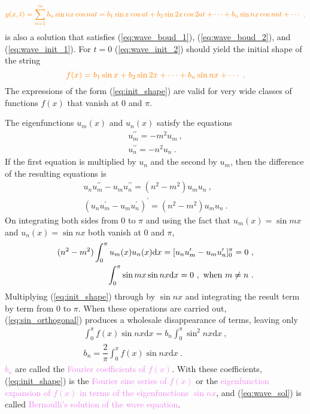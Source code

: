 \documentclass[12pt,a4paper]{article}
\newcommand{\dif}{\mathrm{d}}
\begin{document}
\begin{equation}
\color{orange} y(x,t) = \sum_{n=1}^\infty b_n \sin nx \cos nat = b_1 \sin x \cos at +b_2 \sin 2x \cos 2at +\cdots +b_n \sin nx \cos nat + \cdots ~,
\label{eq:wave_sol}
\end{equation}
is also a solution that satisfies (\ref{eq:wave_boud_1}), (\ref{eq:wave_boud_2}), and (\ref{eq:wave_init_1}). For $t =0$ (\ref{eq:wave_init_2}) should yield the initial shape of the string
\begin{equation}
\color{orange} f(x) = b_1 \sin x+b_2 \sin 2x  +\cdots +b_n \sin nx + \cdots ~.
\label{eq:init_shape}
\end{equation}
The expressions of the form (\ref{eq:init_shape}) are valid for very wide classes of functions $f(x)$ that vanish at $0$ and $\pi$. 

The eigenfunctions $u_m(x)$ and $u_n(x)$ satisfy the equations
\begin{align*}
u^{\prime \prime}_m = -m^2 u_m ~, \\
u^{\prime \prime}_n = -n^2 u_n ~.
\end{align*}
If the first equation is multiplied by $u_n$ and the second by $u_m$, then the difference of the resulting equations is
\begin{align}
\nonumber u_n u^{\prime \prime}_m - u_m u^{\prime \prime}_n = (n^2 -m^2) u_m u_n ~, \\
(u_n u^{\prime}_m - u_m u^{\prime}_n)^\prime = (n^2 -m^2) u_m u_n ~.
\end{align}
On integrating both sides from $0$ to $\pi$ and using the fact that $u_m(x)= \sin mx$ and $u_n(x)= \sin nx$ both vanish at $0$ and $\pi$,
\begin{align}
\nonumber (n^2 -m^2) \int_0^\pi u_m(x) u_n(x) \dif x = [u_n u^{\prime}_m - u_m u^{\prime}_n]_0^\pi = 0 ~, \\
\int_0^\pi \sin mx \sin nx \dif x = 0 ~, ~{\rm when} ~ m\neq n ~.
\label{eq:sin_orthogonal}
\end{align}
Multiplying (\ref{eq:init_shape}) through by $\sin nx$ and integrating the result term by term from $0$ to $\pi$. When these operations are carried out, (\ref{eq:sin_orthogonal}) produces a wholesale disappearance of terms, leaving only
\begin{align}
\nonumber \int_0^\pi f(x) \sin nx \dif x = b_n \int_0^\pi \sin^2 nx \dif x ~, \\
b_n = \dfrac{2}{\pi} \int_0^\pi f(x) \sin nx \dif x ~.
\label{eq:b_n}
\end{align}
\textcolor{violet}{$b_n$} are called the \textcolor{violet}{Fourier coefficients of $f(x)$}. With these coefficients, (\ref{eq:init_shape}) is the \textcolor{violet}{Fourier sine series of $f(x)$} or the \textcolor{violet}{eigenfunction expansion of $f(x)$ in terms of the eigenfunctions $\sin nx$}, and (\ref{eq:wave_sol}) is called \textcolor{violet}{Bernoulli's solution of the wave equation}.
\end{document}
